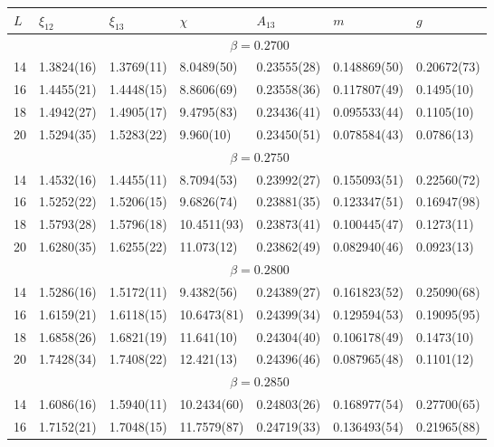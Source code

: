 \documentclass[12pt]{article}
\begin{document}
\begin{table}[t]
\begin{center}
{
\tiny
\begin{tabular}{|l|l|l|l|l|l|l|}
 \hline 
 \hfil $L$ \hfil &  \hfil $\xi_{12}$ \hfil & \hfil $\xi_{13}$ \hfil & \hfil 
  $\chi$ \hfil & \hfil $A_{13}$ \hfil & \hfil $m$ \hfil & \hfil $g$ \hfil  \\ 
 \hline 
 & \multicolumn{6}{|c|}{$ \beta = 0.2700 $} \\ 
 \hline 
14 & 1.3824(16) & 1.3769(11) & 8.0489(50) & 0.23555(28) & 0.148869(50) & 0.20672(73)\\ 
16 & 1.4455(21) & 1.4448(15) & 8.8606(69) & 0.23558(36) & 0.117807(49) & 0.1495(10)\\ 
18 & 1.4942(27) & 1.4905(17) & 9.4795(83) & 0.23436(41) & 0.095533(44) & 0.1105(10)\\ 
20 & 1.5294(35) & 1.5283(22) & 9.960(10) & 0.23450(51) & 0.078584(43) &
0.0786(13)\\ 
\hline 
  & \multicolumn{6}{|c|}{$ \beta = 0.2750 $} \\ 
 \hline 
14 & 1.4532(16) & 1.4455(11) & 8.7094(53) & 0.23992(27) & 0.155093(51) & 0.22560(72)\\ 
16 & 1.5252(22) & 1.5206(15) & 9.6826(74) & 0.23881(35) & 0.123347(51) & 0.16947(98)\\ 
18 & 1.5793(28) & 1.5796(18) & 10.4511(93) & 0.23873(41) & 0.100445(47) & 0.1273(11)\\ 
20 & 1.6280(35) & 1.6255(22) & 11.073(12) & 0.23862(49) & 0.082940(46) & 0.0923(13)\\ 
\hline 
  & \multicolumn{6}{|c|}{$ \beta = 0.2800 $} \\ 
 \hline 
14 & 1.5286(16) & 1.5172(11) & 9.4382(56) & 0.24389(27) & 0.161823(52) & 0.25090(68)\\ 
16 & 1.6159(21) & 1.6118(15) & 10.6473(81) & 0.24399(34) & 0.129594(53) & 0.19095(95)\\ 
18 & 1.6858(26) & 1.6821(19) & 11.641(10) & 0.24304(40) & 0.106178(49) & 0.1473(10)\\ 
20 & 1.7428(34) & 1.7408(22) & 12.421(13) & 0.24396(46) & 0.087965(48) & 0.1101(12)\\ 
\hline 
  & \multicolumn{6}{|c|}{$ \beta = 0.2850 $} \\ 
 \hline 
14 & 1.6086(16) & 1.5940(11) & 10.2434(60) & 0.24803(26) & 0.168977(54) & 0.27700(65)\\ 
16 & 1.7152(21) & 1.7048(15) & 11.7579(87) & 0.24719(33) & 0.136493(54) & 0.21965(88)\\ 

\end{tabular}}
\end{center}
\end{table}
\end{document}
